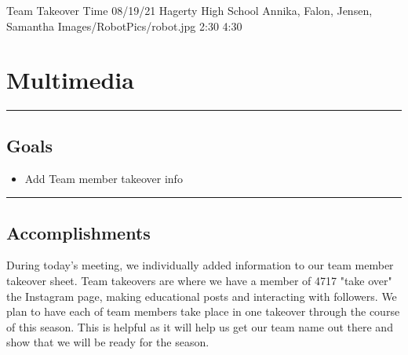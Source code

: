 \insertmeeting 
	{Team Takeover Time} 
	{08/19/21}
	{Hagerty High School}
	{Annika, Falon, Jensen, Samantha}
	{Images/RobotPics/robot.jpg}
	{2:30}
  {4:30}
	
\section*{Multimedia}
\noindent\hfil\rule{\textwidth}{.4pt}\hfil
\subsection*{Goals}
\begin{itemize}
    \item Add Team member takeover info  

\end{itemize} 

\noindent\hfil\rule{\textwidth}{.4pt}\hfil

\subsection*{Accomplishments}
During today's meeting, we individually added information to our team member takeover sheet. Team takeovers are where we have a member of 4717 "take over" the Instagram page, making educational posts and interacting with followers. We plan to have each of team members take place in one takeover through the course of this season. This is helpful as it will help us get our team name out there and show that we will be ready for the season.